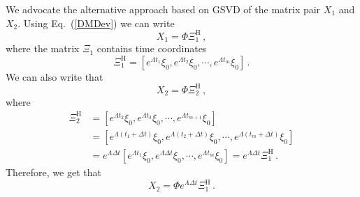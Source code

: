 \documentclass[10pt]{article}
\newcommand{\eq}[1]{Eq.\ (\ref{#1})}
\begin{document}
We advocate the alternative approach based on GSVD of the matrix pair $X_1$ and $X_2$.
Using \eq{DMDev} we can write
\begin{equation}
    X_1 = \Phi \Xi_1^\mathrm{H}\,,
\end{equation}
where the matrix $\Xi_1$ contains time coordinates
\begin{equation}
    \Xi_1^\mathrm{H} = \left[ e^{\Lambda t_1} \xi_0, e^{\Lambda t_2} \xi_0, \cdots , e^{\Lambda t_m} \xi_0\right]\,.
\end{equation}
We can also write that
\begin{equation}
    X_2 = \Phi \Xi_2^\mathrm{H}\,,
\end{equation}
where 
\begin{equation}
\begin{aligned}
    \Xi_2^\mathrm{H} &= \left[ e^{\Lambda t_2} \xi_0, e^{\Lambda t_3} \xi_0, \cdots , e^{\Lambda t_{m+1}} \xi_0\right]\\ &= \left[ e^{\Lambda (t_1+\Delta t)} \xi_0, e^{\Lambda (t_2+\Delta t)} \xi_0, \cdots , e^{\Lambda (t_m+\Delta t)} \xi_0\right]\\
    &= e^{\Lambda \Delta t}\left[ e^{\Lambda t_1} \xi_0, e^{\Lambda \Delta t} \xi_0, \cdots , e^{\Lambda t_m} \xi_0\right]=e^{\Lambda \Delta t}\Xi_1^\mathrm{H}\,.
\end{aligned}
\end{equation}
Therefore, we get that 
\begin{equation}
    X_2 = \Phi e^{\Lambda \Delta t} \Xi_1^\mathrm{H}\,.
\end{equation}
\end{document}
